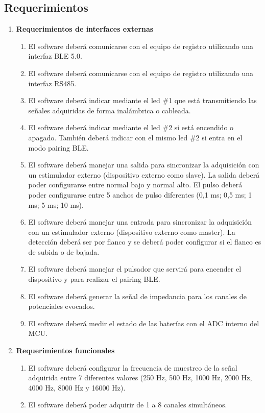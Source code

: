 \subsection{Requerimientos}
\begin{enumerate}
	\item \textbf{Requerimientos de interfaces externas}
		\begin{enumerate}
			\item El software deberá comunicarse con el equipo de registro utilizando una interfaz BLE 5.0.
			\item El software deberá comunicarse con el equipo de registro utilizando una interfaz RS485. 
			\item El software deberá indicar mediante el led \#1 que está transmitiendo las señales adquiridas de forma inalámbrica o cableada. 
			\item El software deberá indicar mediante el led \#2 si está encendido o apagado. También deberá indicar con el mismo led \#2 si entra en el modo pairing BLE.
			\item El software deberá manejar una salida para sincronizar la adquisición con un estimulador externo (dispositivo externo como slave). La salida deberá poder configurarse entre normal bajo y normal alto. El pulso deberá poder configurarse entre 5 anchos de pulso diferentes (0,1 ms; 0,5 ms; 1 ms; 5 ms; 10 ms). 
			\item El software deberá manejar una entrada para sincronizar la adquisición con un estimulador externo (dispositivo externo como master). La detección deberá ser por flanco y se deberá poder configurar si el flanco es de subida o de bajada.
			\item El software deberá manejar el pulsador que servirá para encender el dispositivo y para realizar el pairing BLE.
			\item El software deberá generar la señal de impedancia para los canales de potenciales evocados.
			\item El software deberá medir el estado de las baterías con el ADC interno del MCU.
		\end{enumerate}
	\item \textbf{Requerimientos funcionales}
		\begin{enumerate}
			\item El software deberá configurar la frecuencia de muestreo de la señal adquirida entre 7 diferentes valores (250 Hz, 500 Hz, 1000 Hz, 2000 Hz, 4000 Hz, 8000 Hz y 16000 Hz).
			\item El software deberá poder adquirir de 1 a 8 canales simultáneos.

\end{enumerate}
\end{enumerate}
